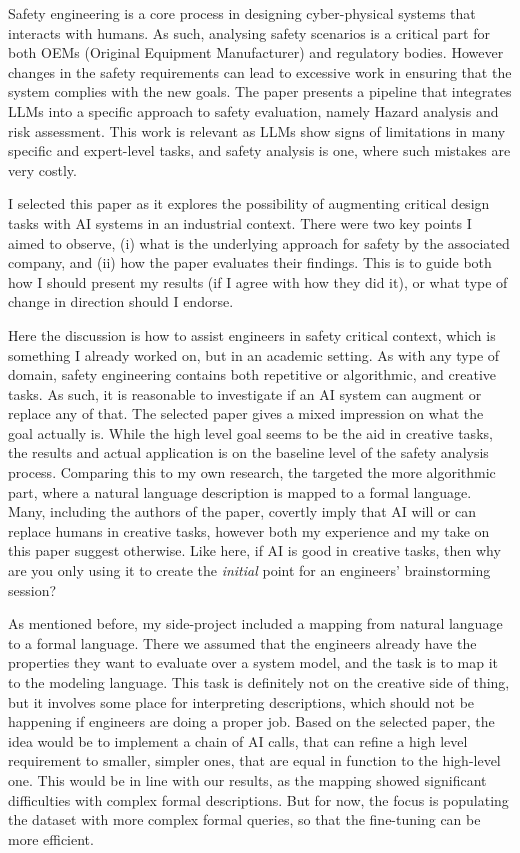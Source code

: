\documentclass{article}
\begin{document}
Safety engineering is a core process in designing cyber-physical systems that interacts with humans. 
As such, analysing safety scenarios is a critical part for both OEMs (Original Equipment Manufacturer) and regulatory bodies. 
However changes in the safety requirements can lead to excessive work in ensuring that the system complies with the new goals.
The paper presents a pipeline that integrates LLMs into a specific approach to safety evaluation, namely Hazard analysis and risk assessment.
This work is relevant as LLMs show signs of limitations in many specific and expert-level tasks, and safety analysis is one, where such mistakes are very costly.

I selected this paper as it explores the possibility of augmenting critical design tasks with AI systems in an industrial context.
There were two key points I aimed to observe, (i) what is the underlying approach for safety by the associated company, and (ii) how the paper evaluates their findings.
This is to guide both how I should present my results (if I agree with how they did it), or what type of change in direction should I endorse.

Here the discussion is how to assist engineers in safety critical context, which is something I already worked on, but in an academic setting. 
As with any type of domain, safety engineering contains both repetitive or algorithmic, and creative tasks.
As such, it is reasonable to investigate if an AI system can augment or replace any of that. 
The selected paper gives a mixed impression on what the goal actually is. 
While the high level goal seems to be the aid in creative tasks, the results and actual application is on the baseline level of the safety analysis process. 
Comparing this to my own research, the targeted the more algorithmic part, where a natural language description is mapped to a formal language. 
Many, including the authors of the paper, covertly imply that AI will or can replace humans in creative tasks, however both my experience and my take on this paper suggest otherwise. 
Like here, if AI is good in creative tasks, then why are you only using it to create the \emph{initial} point for an engineers' brainstorming session?

As mentioned before, my side-project included a mapping from natural language to a formal language. 
There we assumed that the engineers already have the properties they want to evaluate over a system model, and the task is to map it to the modeling language.
This task is definitely not on the creative side of thing, but it involves some place for interpreting descriptions, which should not be happening if engineers are doing a proper job.
Based on the selected paper, the idea would be to implement a chain of AI calls, that can refine a high level requirement to smaller, simpler ones, that are equal in function to the high-level one.
This would be in line with our results, as the mapping showed significant difficulties with complex formal descriptions.
But for now, the focus is populating the dataset with more complex formal queries, so that the fine-tuning can be more efficient.
\end{document}

